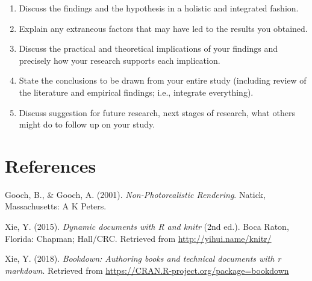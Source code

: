 \documentclass[12pt,letterpaper,oneside,oldfontcommands]{memoir}
\providecommand{\tightlist}{%
  \setlength{\itemsep}{0pt}\setlength{\parskip}{0pt}}
\theoremstyle{definition}
\theoremstyle{definition}
\theoremstyle{definition}
\theoremstyle{remark}
\begin{document}
\begin{enumerate}
\def\labelenumi{\arabic{enumi}.}
\tightlist
\item
  Discuss the findings and the hypothesis in a holistic and integrated
  fashion.
\item
  Explain any extraneous factors that may have led to the results you
  obtained.
\item
  Discuss the practical and theoretical implications of your findings
  and precisely how your research supports each implication.
\item
  State the conclusions to be drawn from your entire study (including
  review of the literature and empirical findings; i.e., integrate
  everything).
\item
  Discuss suggestion for future research, next stages of research, what
  others might do to follow up on your study.
\end{enumerate}

\clearpage

\hypertarget{references}{%
\chapter*{References}\label{references}}

\setlength{\parindent}{-0.2in}
\setlength{\leftskip}{0.2in}
\setlength{\parskip}{8pt}

\noindent

\hypertarget{refs}{}
\leavevmode\hypertarget{ref-goochandgooch2001}{}%
Gooch, B., \& Gooch, A. (2001). \emph{Non-Photorealistic Rendering}.
Natick, Massachusetts: A K Peters.

\leavevmode\hypertarget{ref-xie2015}{}%
Xie, Y. (2015). \emph{Dynamic documents with R and knitr} (2nd ed.).
Boca Raton, Florida: Chapman; Hall/CRC. Retrieved from
\url{http://yihui.name/knitr/}

\leavevmode\hypertarget{ref-R-bookdown}{}%
Xie, Y. (2018). \emph{Bookdown: Authoring books and technical documents
with r markdown}. Retrieved from
\url{https://CRAN.R-project.org/package=bookdown}
\end{document}
